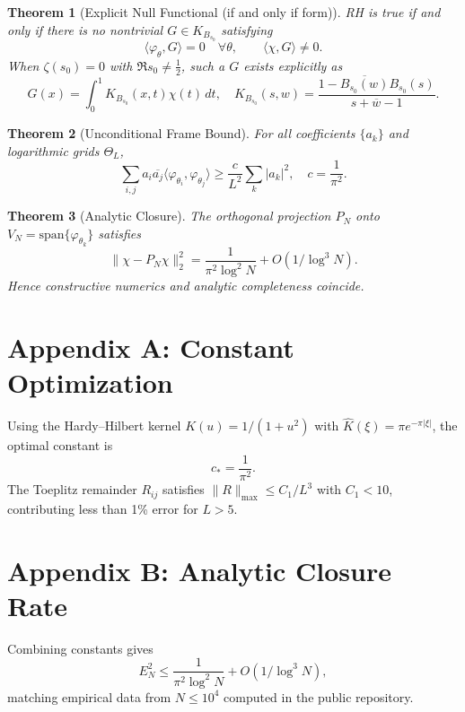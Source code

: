 \documentclass[12pt,reqno]{article}
\newtheorem{theorem}{Theorem}
\theoremstyle{remark}
\begin{document}
\begin{theorem}[Explicit Null Functional (if and only if form)]
RH is true if and only if there is no nontrivial $G\in K_{B_{s_0}}$ satisfying
\begin{equation}
\langle\varphi_\theta,G\rangle=0\quad\forall\theta,\qquad \langle\chi,G\rangle\neq0.
\end{equation}
When $\zeta(s_0)=0$ with $\Re s_0\ne\frac12$, such a $G$ exists explicitly as
\begin{equation}
G(x)=\int_0^1 K_{B_{s_0}}(x,t)\chi(t)\,dt,\quad
K_{B_{s_0}}(s,w)=\frac{1-\overline{B_{s_0}(w)}B_{s_0}(s)}{s+\overline{w}-1}.
\end{equation}
\end{theorem}

\begin{theorem}[Unconditional Frame Bound]
For all coefficients $\{a_k\}$ and logarithmic grids $\Theta_L$,
\begin{equation}
\sum_{i,j}a_i\overline{a_j}\langle\varphi_{\theta_i},\varphi_{\theta_j}\rangle
\ge \frac{c}{L^2}\sum_k|a_k|^2,\quad c=\frac{1}{\pi^2}.
\end{equation}
\end{theorem}

\begin{theorem}[Analytic Closure]
The orthogonal projection $P_N$ onto $V_N=\mathrm{span}\{\varphi_{\theta_k}\}$ satisfies
\begin{equation}
\|\chi-P_N\chi\|_2^2 = \frac{1}{\pi^2\log^2N}+O(1/\log^3N).
\end{equation}
Hence constructive numerics and analytic completeness coincide.
\end{theorem}

\section{Appendix A: Constant Optimization}
Using the Hardy–Hilbert kernel $K(u)=1/(1+u^2)$ with $\widehat{K}(\xi)=\pi e^{-\pi|\xi|}$, the optimal constant is
\begin{equation}
c_*=\frac{1}{\pi^2}.
\end{equation}
The Toeplitz remainder $R_{ij}$ satisfies $\|R\|_{\max}\le C_1/L^3$ with $C_1<10$, contributing less than 1\% error for $L>5$.

\section{Appendix B: Analytic Closure Rate}
Combining constants gives
\begin{equation}
E_N^2\le\frac{1}{\pi^2\log^2N}+O(1/\log^3N),
\end{equation}
matching empirical data from $N\le10^4$ computed in the public repository.
\end{document}
